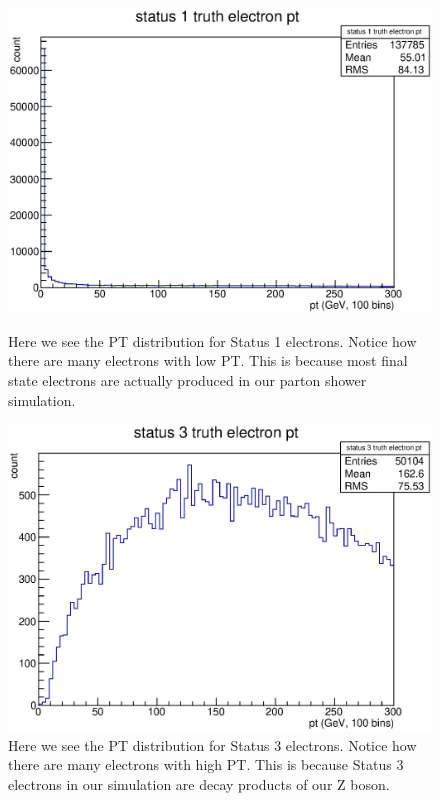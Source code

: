 \documentclass{article}
\begin{document}
\begin{figure}[!htbp]
\begin{minipage}{0.45\textwidth}
	\centering
	\includegraphics[width = \linewidth]{truth_electron_1_pt.eps}
	\caption{Here we see the PT distribution for Status 1 electrons. Notice how there are many electrons with low PT. This is because most final state electrons are actually produced in our parton shower simulation.}
	\label{fig:truthElectron1PT}
\end{minipage}
\hspace{0.1\textwidth}
\begin{minipage}{0.45\textwidth}
	\centering
	\includegraphics[width = \linewidth]{truth_electron_3_pt.eps}
	\caption{Here we see the PT distribution for Status 3 electrons. Notice how there are many electrons with high PT. This is because Status 3 electrons in our simulation are decay products of our Z boson.}
	\label{fig:truthElectron3PT}
\end{minipage}
\end{figure}
\end{document}
